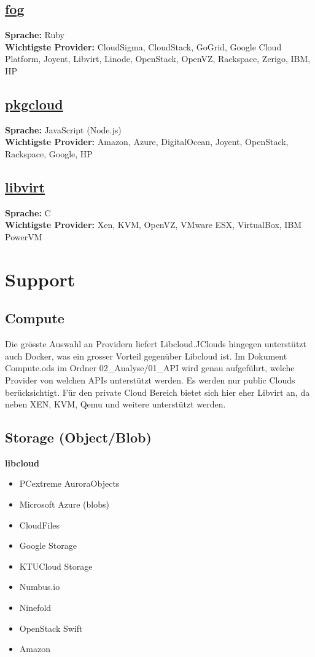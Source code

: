 \subsection{\href{https://github.com/fog/fog/blob/master/lib/fog/openstack/docs/getting_started.md}{fog}}
\textbf{Sprache: }Ruby\\
\textbf{Wichtigste Provider: }CloudSigma, CloudStack, GoGrid, Google Cloud Platform, Joyent, 
Libvirt, Linode, OpenStack, OpenVZ, Rackspace, Zerigo, IBM, HP\\

\subsection{\href{https://github.com/pkgcloud/pkgcloud}{pkgcloud}}
\textbf{Sprache: }JavaScript (Node.js)\\
\textbf{Wichtigste Provider: }Amazon, Azure, DigitalOcean, Joyent, OpenStack, Rackspace, Google, HP\\

\subsection{\href{http://http://libvirt.org/}{libvirt}}
\textbf{Sprache: }C\\
\textbf{Wichtigste Provider: }Xen, KVM, OpenVZ, VMware ESX, VirtualBox, IBM PowerVM\\

\newpage

\section{Support}
\subsection{Compute}
Die grösste Auswahl an Providern liefert Libcloud.JClouds hingegen 
unterstützt auch Docker, was ein grosser Vorteil gegenüber Libcloud ist. Im 
Dokument Compute.ods im Ordner 02\_Analyse\//01\_API wird genau aufgeführt, 
welche Provider von welchen APIs unterstützt werden. Es werden nur public Clouds berücksichtigt.
Für den private Cloud Bereich bietet sich hier eher Libvirt an, da neben XEN, 
KVM, Qemu und weitere unterstützt werden.

\subsection{Storage (Object/Blob)}
\textbf{libcloud}
\begin{itemize}
\item PCextreme AuroraObjects
\item Microsoft Azure (blobs)
\item CloudFiles
\item Google Storage
\item KTUCloud Storage
\item Numbus.io
\item Ninefold
\item OpenStack Swift
\item Amazon
\end{itemize}

